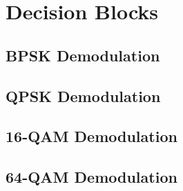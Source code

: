 \documentclass[]{article}
\begin{document}
\section{Decision Blocks}
\label{app:dblocks}
\subsection{BPSK Demodulation}
\label{app:bpsk_demod}

\cleardoublepage
\newpage

\subsection{QPSK Demodulation}
\label{app:qpsk_demod}

\cleardoublepage
\newpage

\subsection{16-QAM Demodulation}
\label{app:qam_16_demod}

\cleardoublepage
\newpage

\subsection{64-QAM Demodulation}
\label{app:qam_64_demod}

\cleardoublepage
\newpage
\end{document}
